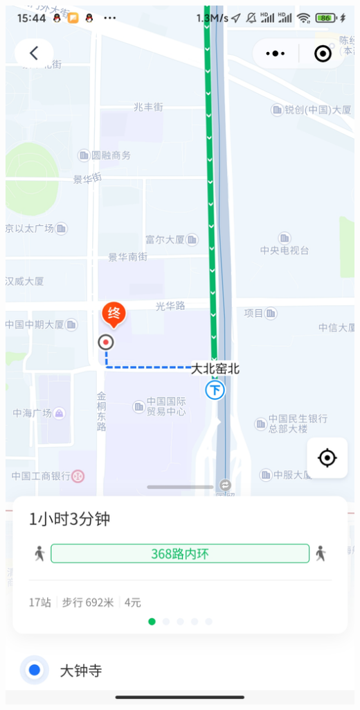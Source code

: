 \documentclass{beamer}
\begin{document}
\begin{frame}
	\begin{columns}
		\includegraphics[width=0.7\linewidth]{figure/map_example-tencent-detail.jpg}
		        

\end{columns}
\end{frame}
\end{document}
